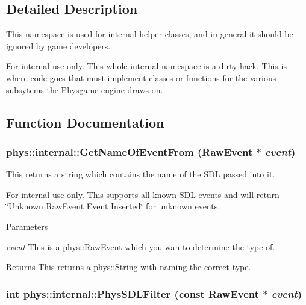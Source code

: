 \subsection{Detailed Description}
This namespace is used for internal helper classes, and in general it should be ignored by game developers. \begin{DoxyInternal}{For internal use only.}
This whole internal namespace is a dirty hack. This is where code goes that must implement classes or functions for the various subsytems the Physgame engine draws on. \end{DoxyInternal}


\subsection{Function Documentation}
\hypertarget{namespacephys_1_1internal_a8ca9bdbec082de74b347496001b9615f}{
\subsubsection[{GetNameOfEventFrom}]{ phys::internal::GetNameOfEventFrom (RawEvent $\ast$ {\em event})}}
\label{d0/d26/namespacephys_1_1internal_a8ca9bdbec082de74b347496001b9615f}


This returns a string which contains the name of the SDL passed into it. 

\begin{DoxyInternal}{For internal use only.}
This supports all known SDL events and will return \char`\"{}Unknown RawEvent Event Inserted\char`\"{} for unknown events. 
\begin{DoxyParams}{Parameters}
\item[{\em event}]This is a \hyperlink{namespacephys_a8126d26e4507e66d09876988bb941fd4}{phys::RawEvent} which you wan to determine the type of. \end{DoxyParams}
\begin{DoxyReturn}{Returns}
This returns a \hyperlink{namespacephys_aa03900411993de7fbfec4789bc1d392e}{phys::String} with naming the correct type. 
\end{DoxyReturn}
\end{DoxyInternal}
\hypertarget{namespacephys_1_1internal_aae2a1133a05c67ac3062038c0c5dad4a}{
\subsubsection[{PhysSDLFilter}]{\setlength{\rightskip}{0pt plus 5cm}int phys::internal::PhysSDLFilter (const RawEvent $\ast$ {\em event})}}
\label{d0/d26/namespacephys_1_1internal_aae2a1133a05c67ac3062038c0c5dad4a}



